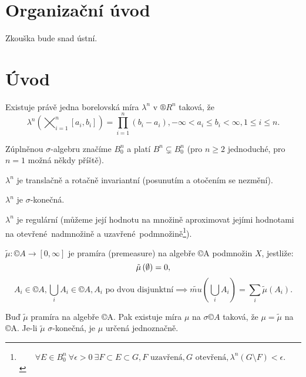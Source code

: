 \documentclass[12pt]{article}					%
\begin{document}

\section*{Organizační úvod}
	\begin{poznamka}
		Zkouška bude snad ústní.
	\end{poznamka}

\section*{Úvod}
\begin{veta}
	Existuje právě jedna borelovská míra $\lambda^n$ v $®R^n$ taková, že
	$$ \lambda^n\left(\bigtimes_{i=1}^n[a_i, b_i]\right) = \prod_{i=1}^n \left(b_i - a_i\right), -∞ < a_i ≤ b_i < ∞, 1 ≤ i ≤ n. $$

	\begin{poznamkain}
		Zúplněnou $\sigma$-algebru značíme $B_0^n$ a platí $B^n \subsetneq B_0^n$ (pro $n ≥ 2$ jednoduché, pro $n = 1$ možná někdy příště).

		$\lambda^n$ je translačně a rotačně invariantní (posunutím a otočením se nezmění).

		$\lambda^n$ je $\sigma$-konečná.

		$\lambda^n$ je regulární (můžeme její hodnotu na množině aproximovat jejími hodnotami na otevřené nadmnožině a uzavřené podmnožině\footnote{$$ \forall E \in B_0^n\ \forall \epsilon > 0\ \exists F \subset E \subset G, F\text{ uzavřená}, G\text{ otevřená}, \lambda^n\left(G \setminus F \right) < \epsilon.  $$}).
	\end{poznamkain}
\end{veta}

\begin{definice}
	$\tilde{\mu}: ©A \rightarrow [0, ∞]$ je pramíra (premeasure) na algebře ©A podmnožin $X$, jestliže:
	$$ \tilde{\mu}\left(\emptyset\right) = 0, $$
	$$ A_i \in ©A, \bigcup_i A_i \in ©A, A_i \text{ po dvou disjunktní} \implies \tilde{mu}\left(\bigcup_iA_i\right) = \sum_i \tilde{\mu}\left(A_i\right). $$
\end{definice}

\begin{veta}
	Buď $\tilde{\mu}$ pramíra na algebře ©A. Pak existuje míra $\mu$ na $\sigma ©A$ taková, že $\mu = \tilde{\mu}$ na ©A. Je-li $\tilde{\mu}$ $\sigma$-konečná, je $\mu$ určená jednoznačně.
\end{veta}
\end{document}
